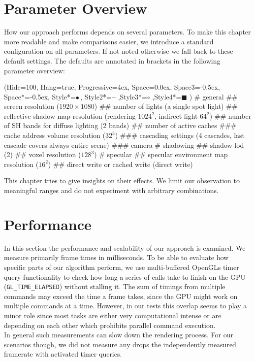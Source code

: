 \documentclass[thesis.tex]{subfiles}
\begin{document}
\section{Parameter Overview}
How our approach performs depends on several parameters.
To make this chapter more readable and make comparisons easier, we introduce a standard configuration on all parameters.
If not noted otherwise we fall back to these default settings.
The defaults are annotated in brackets in the following parameter overview:
\begin{easylist}
\ListProperties(Hide=100, Hang=true, Progressive=4ex, Space=0.0ex, Space3=-0.5ex, Space*=-0.5ex, Style*=$\bullet\,$,
Style2*=\textbf{--} ,Style3*=$\circ$ ,Style4*=\tiny$\blacksquare$ )
# general
## screen resolution ($1920\times1080$)
## number of lights (a single spot light)
## reflective shadow map resolution (rendering $1024^2$, indirect light $64^2$)
## number of SH bands for diffuse lighting (2 bands)
## number of active caches
### cache address volume resolution ($32^3$)
### cascading settings (4 cascades, last cascade covers always entire scene)
### camera
# shadowing
## shadow lod (2)
## voxel resolution ($128^3$)
# specular
## specular environment map resolution ($16^2$)
## direct write or cached write (direct write)
\end{easylist}
This chapter tries to give insights on their effects.
We limit our observation to meaningful ranges and do not experiment with arbitrary combinations.


\section{Performance}
In this section the performance and scalability of our approach is examined.
We measure primarily frame times in milliseconds.
To be able to evaluate how specific parts of our algorithm perform, we use multi-buffered OpenGLs timer query functionality to check how long a series of calls take to finish on the GPU (\texttt{GL\_TIME\_ELAPSED}) without stalling it.
The sum of timings from multiple commands may exceed the time a frame takes, since the GPU might work on multiple commands at a time.
However, in our tests this overlap seems to play a minor role since most tasks are either very computational intense or are depending on each other which prohibits parallel command execution.
\\
In general such measurements can slow down the rendering process.
For our scenarios though, we did not measure any drops the independently measured framerate with activated timer queries.
\end{document}

